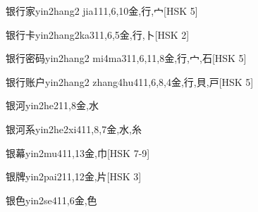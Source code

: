 \begin{EntryWithPhonetic}{银行家}{yin2hang2 jia1}{11,6,10}{⾦,⾏,⼧}[HSK 5]
\end{EntryWithPhonetic}

\begin{EntryWithPhonetic}{银行卡}{yin2hang2ka3}{11,6,5}{⾦,⾏,⼘}[HSK 2]
\end{EntryWithPhonetic}

\begin{EntryWithPhonetic}{银行密码}{yin2hang2 mi4ma3}{11,6,11,8}{⾦,⾏,⼧,⽯}[HSK 5]
\end{EntryWithPhonetic}

\begin{EntryWithPhonetic}{银行账户}{yin2hang2 zhang4hu4}{11,6,8,4}{⾦,⾏,⾙,⼾}[HSK 5]
\end{EntryWithPhonetic}

\begin{EntryWithPhonetic}{银河}{yin2he2}{11,8}{⾦,⽔}
\end{EntryWithPhonetic}

\begin{EntryWithPhonetic}{银河系}{yin2he2xi4}{11,8,7}{⾦,⽔,⽷}
\end{EntryWithPhonetic}

\begin{EntryWithPhonetic}{银幕}{yin2mu4}{11,13}{⾦,⼱}[HSK 7-9]
\end{EntryWithPhonetic}

\begin{EntryWithPhonetic}{银牌}{yin2pai2}{11,12}{⾦,⽚}[HSK 3]
\end{EntryWithPhonetic}

\begin{EntryWithPhonetic}{银色}{yin2se4}{11,6}{⾦,⾊}
\end{EntryWithPhonetic}

